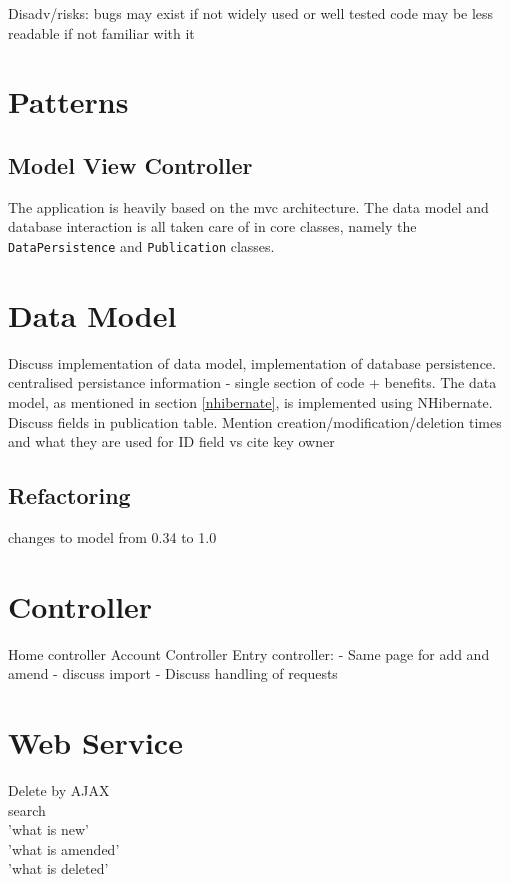 \documentclass{l4proj}
\begin{document}
Disadv/risks:
	bugs may exist if not widely used or well tested
	code may be less readable if not familiar with it
	

\section{Patterns}

\subsection{Model View Controller}
The application is heavily based on the \gls{mvc} architecture.  The data model and database interaction is all taken care of in core classes, namely the \texttt{DataPersistence} and \texttt{Publication} classes.



\section{Data Model}
Discuss implementation of data model, implementation of database persistence. centralised persistance information - single section of code + benefits.
The data model, as mentioned in section \ref{nhibernate}, is implemented using NHibernate.  
Discuss fields in publication table. Mention creation/modification/deletion times and what they are used for
ID field vs cite key
owner


\subsection{Refactoring}
changes to model from 0.34 to 1.0


\section{Controller}
Home controller
Account Controller
Entry controller:
 - Same page for add and amend
 - discuss import
 - 
Discuss handling of requests


\section{Web Service}
Delete by AJAX\\
search\\
'what is new'\\
'what is amended'\\
'what is deleted'\\
\end{document}

